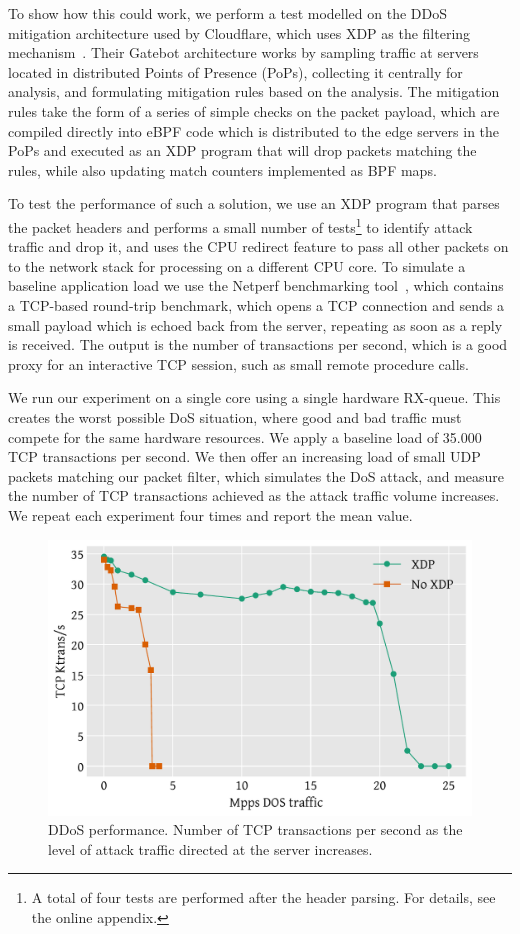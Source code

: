 \documentclass[10pt,sigconf]{acmart}
\begin{document}
To show how this could work, we perform a test modelled on the DDoS mitigation
architecture used by Cloudflare, which uses XDP as the filtering
mechanism~\cite{cloudflare-ddos}. Their Gatebot architecture works by sampling
traffic at servers located in distributed Points of Presence (PoPs), collecting
it centrally for analysis, and formulating mitigation rules based on the
analysis. The mitigation rules take the form of a series of simple checks on the
packet payload, which are compiled directly into eBPF code which is distributed
to the edge servers in the PoPs and executed as an XDP program that will drop
packets matching the rules, while also updating match counters implemented as
BPF maps.

To test the performance of such a solution, we use an XDP program that parses
the packet headers and performs a small number of tests\footnote{A total of four
  tests are performed after the header parsing. For details, see the online
  appendix.} to identify attack traffic and drop it, and uses the CPU redirect
feature to pass all other packets on to the network stack for processing on a
different CPU core. To simulate a baseline application load we use the Netperf
benchmarking tool~\cite{netperf}, which contains a TCP-based round-trip
benchmark, which opens a TCP connection and sends a small payload which is
echoed back from the server, repeating as soon as a reply is received. The
output is the number of transactions per second, which is a good proxy for an
interactive TCP session, such as small remote procedure calls.

We run our experiment on a single core using a single hardware RX-queue.  This
creates the worst possible DoS situation, where good and bad traffic must
compete for the same hardware resources. We apply a baseline load of 35.000 TCP
transactions per second. We then offer an increasing load of small UDP packets
matching our packet filter, which simulates the DoS attack, and measure the
number of TCP transactions achieved as the attack traffic volume increases. We
repeat each experiment four times and report the mean value.

\begin{figure}[t]
\centering
\includegraphics[width=\linewidth]{figures/ddos-test.pdf}
\caption{\label{fig:ddos-results} DDoS performance. Number of TCP transactions
  per second as the level of attack traffic directed at the server increases.}
\end{figure}
\end{document}
